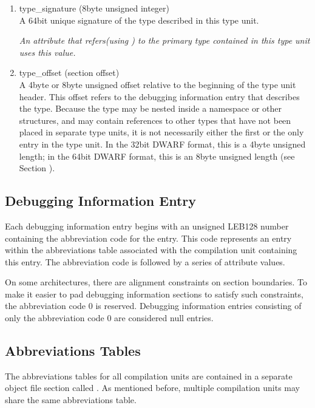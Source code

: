 \begin{enumerate}[1.]
\item type\_signature (8\dash byte unsigned integer) \\
A 64\dash bit unique signature of the type described in this type
unit.  

\textit{An attribute that refers(using ) to
the primary type contained in this type unit uses this value.}


\item type\_offset (section offset) \\
A 4\dash byte or 8\dash byte unsigned offset relative to the beginning
of the type unit header. This offset refers to the debugging
information entry that describes the type. Because the type
may be nested inside a namespace or other structures, and may
contain references to other types that have not been placed in
separate type units, it is not necessarily either the first or
the only entry in the type unit. In the 32\dash bit DWARF format,
this is a 4\dash byte unsigned length; in the 64\dash bit DWARF format,
this is an 8\dash byte unsigned length
(see Section ).

\end{enumerate}

\subsection{Debugging Information Entry}
\label{datarep:debugginginformationentry}

Each debugging information entry begins with an unsigned LEB128
number containing the abbreviation code for the entry. This
code represents an entry within the abbreviations table
associated with the compilation unit containing this entry. The
abbreviation code is followed by a series of attribute values.

On some architectures, there are alignment constraints on
section boundaries. To make it easier to pad debugging
information sections to satisfy such constraints, the
abbreviation code 0 is reserved. Debugging information entries
consisting of only the abbreviation code 0 are considered
null entries.

\subsection{Abbreviations Tables}
\label{datarep:abbreviationstables}

The abbreviations tables for all compilation units
are contained in a separate object file section called
.
As mentioned before, multiple compilation
units may share the same abbreviations table.

